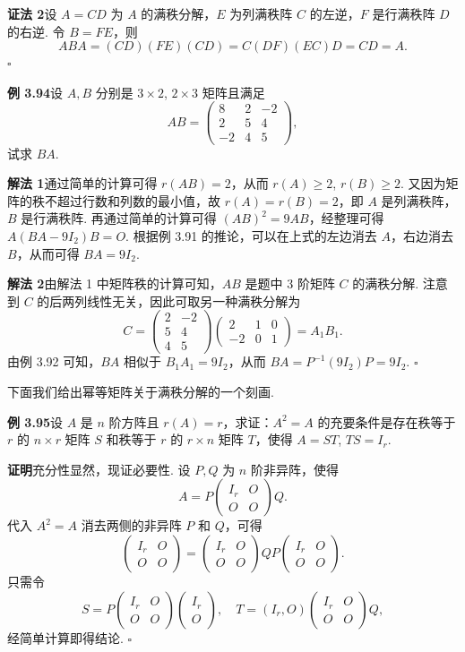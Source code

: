 \documentclass[UTF8,12pt,a4paper,fontset=fandol]{ctexart}
\begin{document}
\noindent\textbf{证法 2}\quad 设 $A=CD$ 为 $A$ 的满秩分解，$E$ 为列满秩阵 $C$ 的左逆，$F$ 是行满秩阵 $D$ 的右逆. 令 $B=FE$，则
\[
ABA=(CD)(FE)(CD)=C(DF)(EC)D=CD=A.
\]
$\square$

\noindent\textbf{例 3.94}\quad 设 $A,B$ 分别是 $3\times 2$, $2\times 3$ 矩阵且满足
\[
AB=\begin{pmatrix}
8&2&-2\\
2&5&4\\
-2&4&5
\end{pmatrix},
\]
试求 $BA$.

\noindent\textbf{解法 1}\quad 通过简单的计算可得 $r(AB)=2$，从而 $r(A)\ge 2$, $r(B)\ge 2$. 又因为矩阵的秩不超过行数和列数的最小值，故 $r(A)=r(B)=2$，即 $A$ 是列满秩阵，$B$ 是行满秩阵. 再通过简单的计算可得 $(AB)^2=9AB$，经整理可得 $A(BA-9I_2)B=O$. 根据例 3.91 的推论，可以在上式的左边消去 $A$，右边消去 $B$，从而可得 $BA=9I_2$.

\noindent\textbf{解法 2}\quad 由解法 1 中矩阵秩的计算可知，$AB$ 是题中 3 阶矩阵 $C$ 的满秩分解. 注意到 $C$ 的后两列线性无关，因此可取另一种满秩分解为
\[
C=\begin{pmatrix}
2&-2\\
5&4\\
4&5
\end{pmatrix}
\begin{pmatrix}
2&1&0\\
-2&0&1
\end{pmatrix}
=A_1B_1.
\]
由例 3.92 可知，$BA$ 相似于 $B_1A_1=9I_2$，从而 $BA=P^{-1}(9I_2)P=9I_2$. $\square$

下面我们给出幂等矩阵关于满秩分解的一个刻画.

\noindent\textbf{例 3.95}\quad 设 $A$ 是 $n$ 阶方阵且 $r(A)=r$，求证：$A^2=A$ 的充要条件是存在秩等于 $r$ 的 $n\times r$ 矩阵 $S$ 和秩等于 $r$ 的 $r\times n$ 矩阵 $T$，使得 $A=ST$, $TS=I_r$.

\noindent\textbf{证明}\quad 充分性显然，现证必要性. 设 $P,Q$ 为 $n$ 阶非异阵，使得
\[
A=P\begin{pmatrix}I_r&O\\O&O\end{pmatrix}Q.
\]
代入 $A^2=A$ 消去两侧的非异阵 $P$ 和 $Q$，可得
\[
\begin{pmatrix}I_r&O\\O&O\end{pmatrix}
=
\begin{pmatrix}I_r&O\\O&O\end{pmatrix}
QP
\begin{pmatrix}I_r&O\\O&O\end{pmatrix}.
\]
只需令
\[
S=P\begin{pmatrix}I_r&O\\O&O\end{pmatrix}\begin{pmatrix}I_r\\O\end{pmatrix},\quad
T=(I_r,O)\begin{pmatrix}I_r&O\\O&O\end{pmatrix}Q,
\]
经简单计算即得结论. $\square$
\end{document}
